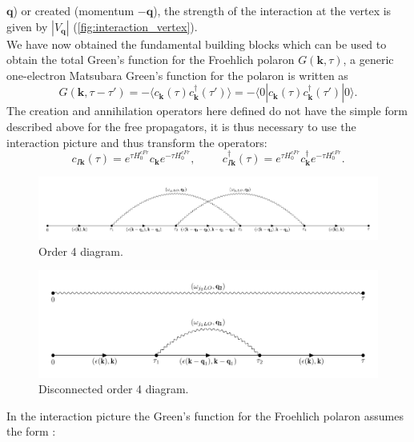 $\mathbf{q}$) or created (momentum $\mathbf{-q}$), the strength of the interaction at the vertex is given by $|V_\mathbf{q}|$ (\ref{fig:interaction_vertex}).\\
We have now obtained the fundamental building blocks which can be used to obtain the total Green's function for the Froehlich polaron 
$G(\mathbf{k},\tau)$, a generic one-electron Matsubara Green's function for the polaron is written as \cite{mishchenko2000diagrammatic}
\begin{equation}
    G(\mathbf{k},\tau-\tau')= -\langle c_\mathbf{k}(\tau)c^\dagger_\mathbf{k}(\tau')\rangle =-\langle 0|c_\mathbf{k}(\tau)c^\dagger_\mathbf{k}(\tau')|0\rangle.
\end{equation}
The creation and annihilation operators here defined do not have the simple form described above for the free propagators, it is thus 
necessary to use the interaction picture and thus transform the operators:
\begin{equation}
    c_{I\mathbf{k}}(\tau)=e^{\tau H^{cFr}_0}c_{\mathbf{k}}e^{-\tau H^{cFr}_0},\hspace{1cm}c^\dagger_{I\mathbf{k}}(\tau)=e^{\tau H^{cFr}_0}c^\dagger_{\mathbf{k}}e^{-\tau H^{cFr}_0}.
\end{equation}
\begin{figure}[H]
    \centering
    \includegraphics[scale=0.55]{diagram_order_4_2.pdf}
    \caption{Order 4 diagram.}
    \label{fig:diagram_order_4_2}
\end{figure}
\begin{figure}[H]
    \centering
    \includegraphics[scale=0.8]{diagram_disconnected.pdf}
    \caption{Disconnected order 4 diagram.}
    \label{fig:diagram_disconnected}
\end{figure}
In the interaction picture the Green's function for the Froehlich polaron assumes the form \cite{mishchenko2005diagrammatic}:
